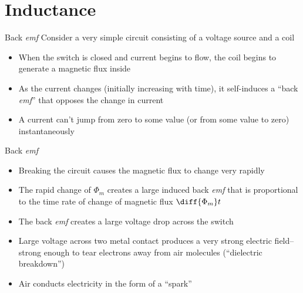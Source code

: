 \documentclass[12pt,aspectratio=169]{beamer}
\begin{document}
\section{Inductance}

\begin{frame}{Back \emph{emf}}
  Consider a very simple circuit consisting of a voltage source and a coil
  \begin{center}
  \end{center}
  \begin{itemize}
  \item When the switch is closed and current begins to flow, the coil
    begins to generate a magnetic flux inside
  \item As the current changes (initially increasing with time), it
    self-induces a ``back \emph{emf}'' that opposes the change in current
  \item A current can't jump from zero to some value (or from some value to
    zero) instantaneously
  \end{itemize}
\end{frame}



\begin{frame}{Back \emph{emf}}
  \begin{center}
  \end{center}
  \begin{itemize}
  \item Breaking the circuit causes the magnetic flux to change very rapidly
  \item The rapid change of $\Phi_m$ creates a large induced back \emph{emf}
    that is proportional to the time rate of change of magnetic flux
    $\diff{\Phi_m}t$
  \item The back \emph{emf} creates a large voltage drop across the switch
  \item Large voltage across two metal contact produces a very strong electric
    field--strong enough to tear electrons away from air molecules
    (``dielectric breakdown'')
  \item Air conducts electricity in the form of a ``spark''
  \end{itemize}
\end{frame}
\end{document}
